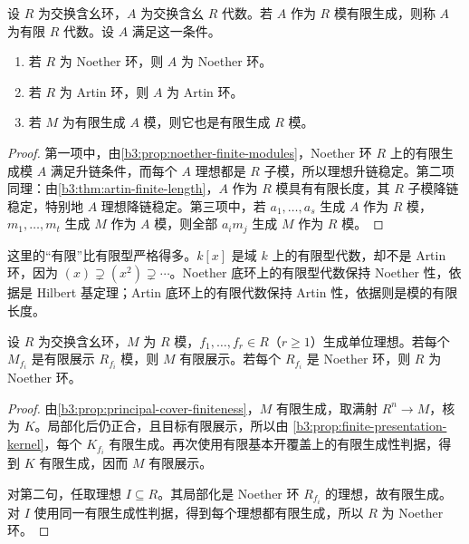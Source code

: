 \begin{proposition}\label{b3:prop:finite-algebra-noether}
	设 \(R\) 为交换含幺环，\(A\) 为交换含幺 \(R\) 代数。若 \(A\) 作为 \(R\) 模有限生成，则称 \(A\) 为有限 \(R\) 代数。设 \(A\) 满足这一条件。
	\begin{enumerate}
		\item 若 \(R\) 为 Noether 环，则 \(A\) 为 Noether 环。
		\item 若 \(R\) 为 Artin 环，则 \(A\) 为 Artin 环。
		\item 若 \(M\) 为有限生成 \(A\) 模，则它也是有限生成 \(R\) 模。
	\end{enumerate}
\end{proposition}
\begin{proof}
	第一项中，由\cref{b3:prop:noether-finite-modules}，Noether 环 \(R\) 上的有限生成模 \(A\) 满足升链条件，而每个 \(A\) 理想都是 \(R\) 子模，所以理想升链稳定。第二项同理：由\cref{b3:thm:artin-finite-length}，\(A\) 作为 \(R\) 模具有有限长度，其 \(R\) 子模降链稳定，特别地 \(A\) 理想降链稳定。第三项中，若 \(a_1,\ldots,a_s\) 生成 \(A\) 作为 \(R\) 模，\(m_1,\ldots,m_t\) 生成 \(M\) 作为 \(A\) 模，则全部 \(a_i m_j\) 生成 \(M\) 作为 \(R\) 模。
\end{proof}

这里的“有限”比有限型严格得多。\(k[x]\) 是域 \(k\) 上的有限型代数，却不是 Artin 环，因为 \((x)\supsetneq(x^2)\supsetneq\cdots\)。Noether 底环上的有限型代数保持 Noether 性，依据是 Hilbert 基定理；Artin 底环上的有限代数保持 Artin 性，依据则是模的有限长度。

\begin{proposition}\label{b3:prop:finite-presentation-open-cover}
	设 \(R\) 为交换含幺环，\(M\) 为 \(R\) 模，\(f_1,\ldots,f_r\in R\)（\(r\ge1\)）生成单位理想。若每个 \(M_{f_i}\) 是有限展示 \(R_{f_i}\) 模，则 \(M\) 有限展示。若每个 \(R_{f_i}\) 是 Noether 环，则 \(R\) 为 Noether 环。
\end{proposition}
\begin{proof}
	由\cref{b3:prop:principal-cover-finiteness}，\(M\) 有限生成，取满射 \(R^n\rightarrow M\)，核为 \(K\)。局部化后仍正合，且目标有限展示，所以由 \cref{b3:prop:finite-presentation-kernel}，每个 \(K_{f_i}\) 有限生成。再次使用有限基本开覆盖上的有限生成性判据，得到 \(K\) 有限生成，因而 \(M\) 有限展示。

	对第二句，任取理想 \(I\subseteq R\)。其局部化是 Noether 环 \(R_{f_i}\) 的理想，故有限生成。对 \(I\) 使用同一有限生成性判据，得到每个理想都有限生成，所以 \(R\) 为 Noether 环。
\end{proof}

